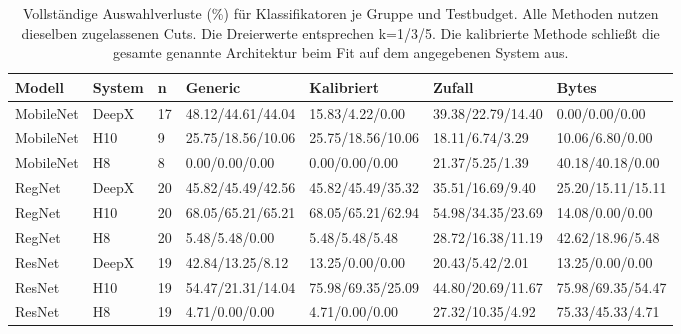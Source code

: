 \begin{table}[t]
\centering
\caption{Vollständige Auswahlverluste (\%) für Klassifikatoren je Gruppe und Testbudget. Alle Methoden nutzen dieselben zugelassenen Cuts. Die Dreierwerte entsprechen k=1/3/5. Die kalibrierte Methode schließt die gesamte genannte Architektur beim Fit auf dem angegebenen System aus.}
\label{tab:supp-calibration-groups}
\begingroup\small\setlength{\tabcolsep}{3pt}
\begin{tabular}{lllllll}
\toprule
Modell & System & n & Generic & Kalibriert & Zufall & Bytes \\
\midrule
MobileNet & DeepX & 17 & 48.12/44.61/44.04 & 15.83/4.22/0.00 & 39.38/22.79/14.40 & 0.00/0.00/0.00 \\
MobileNet & H10 & 9 & 25.75/18.56/10.06 & 25.75/18.56/10.06 & 18.11/6.74/3.29 & 10.06/6.80/0.00 \\
MobileNet & H8 & 8 & 0.00/0.00/0.00 & 0.00/0.00/0.00 & 21.37/5.25/1.39 & 40.18/40.18/0.00 \\
RegNet & DeepX & 20 & 45.82/45.49/42.56 & 45.82/45.49/35.32 & 35.51/16.69/9.40 & 25.20/15.11/15.11 \\
RegNet & H10 & 20 & 68.05/65.21/65.21 & 68.05/65.21/62.94 & 54.98/34.35/23.69 & 14.08/0.00/0.00 \\
RegNet & H8 & 20 & 5.48/5.48/0.00 & 5.48/5.48/5.48 & 28.72/16.38/11.19 & 42.62/18.96/5.48 \\
ResNet & DeepX & 19 & 42.84/13.25/8.12 & 13.25/0.00/0.00 & 20.43/5.42/2.01 & 13.25/0.00/0.00 \\
ResNet & H10 & 19 & 54.47/21.31/14.04 & 75.98/69.35/25.09 & 44.80/20.69/11.67 & 75.98/69.35/54.47 \\
ResNet & H8 & 19 & 4.71/0.00/0.00 & 4.71/0.00/0.00 & 27.32/10.35/4.92 & 75.33/45.33/4.71 \\
\bottomrule
\end{tabular}
\endgroup
\end{table}
